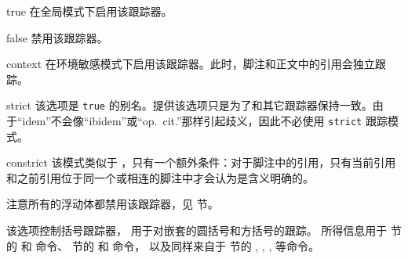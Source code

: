 \begin{optionlist}
\begin{valuelist}
\item[true] %
在全局模式下启用该跟踪器。
\item[false] %
禁用该跟踪器。
\item[context] %
在环境敏感模式下启用该跟踪器。此时，脚注和正文中的引用会独立跟踪。
\item[strict] %
该选项是 \texttt{true} 的别名。提供该选项只是为了和其它跟踪器保持一致。由于“idem”不会像“ibidem”或“op.~cit.”那样引起歧义，因此不必使用 \texttt{strict} 跟踪模式。
\item[constrict] %
该模式类似于 ，只有一个额外条件：对于脚注中的引用，只有当前引用和之前引用位于同一个或相连的脚注中才会认为是含义明确的。
\end{valuelist}

注意所有的浮动体都禁用该跟踪器，见  节。



该选项控制括号跟踪器，
用于对嵌套的圆括号和方括号的跟踪。
所得信息用于  节的   和  命令、
 节的  和  命令，
以及同样来自于  节的 , , ,  等命令。



\end{optionlist}
